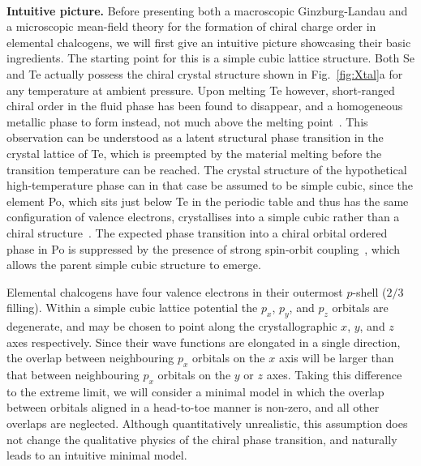 \documentclass[aps,prl,twocolumn,superscriptaddress,groupedaddress]{revtex4}
\begin{document}
~\\
{\bf Intuitive picture.} Before presenting both a macroscopic Ginzburg-Landau and a microscopic mean-field theory for the formation of chiral charge order in elemental chalcogens, we will first give an intuitive picture showcasing their basic ingredients. The starting point for this is a simple cubic lattice structure. Both Se and Te actually possess the chiral crystal structure shown in Fig.~\ref{fig:Xtal}a for any temperature at ambient pressure. Upon melting Te however, short-ranged chiral order in the fluid phase has been found to disappear, and a homogeneous metallic phase to form instead, not much above the melting point~\cite{fluid1,fluid2}. This observation can be understood as a latent structural phase transition in the crystal lattice of Te, which is preempted by the material melting before the transition temperature can be reached. The crystal structure of the hypothetical high-temperature phase can in that case be assumed to be simple cubic, since the element Po, which sits just below Te in the periodic table and thus has the same configuration of valence electrons, crystallises into a simple cubic rather than a chiral structure~\cite{polonium}. The expected phase transition into a chiral orbital ordered phase in Po is suppressed by the presence of strong spin-orbit coupling~\cite{koreans}, which allows the parent simple cubic structure to emerge.

Elemental chalcogens have four valence electrons in their outermost $p$-shell ($2/3$ filling). Within a simple cubic lattice potential the $p_x$, $p_y$, and $p_z$ orbitals are degenerate, and may be chosen to point along the crystallographic $x$, $y$, and $z$ axes respectively. Since their wave functions are elongated in a single direction, the overlap between neighbouring $p_x$ orbitals on the $x$ axis will be larger than that between neighbouring $p_x$ orbitals on the $y$ or $z$ axes. Taking this difference to the extreme limit, we will consider a minimal model in which the overlap between orbitals aligned in a head-to-toe manner is non-zero, and all other overlaps are neglected. Although quantitatively unrealistic, this assumption does not change the qualitative physics of the chiral phase transition, and naturally leads to an intuitive minimal model.
\end{document}
